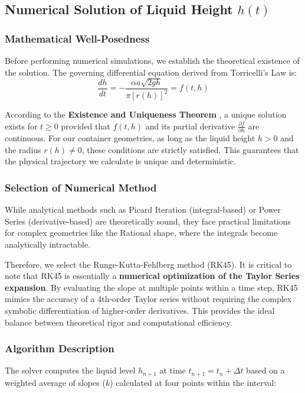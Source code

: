 \documentclass[a4paper, 12pt]{article}
\begin{document}
\subsection{Numerical Solution of Liquid Height $h(t)$}

\subsubsection{Mathematical Well-Posedness}
Before performing numerical simulations, we establish the theoretical existence of the solution. The governing differential equation derived from Torricelli's Law is:
\begin{equation}
    \frac{dh}{dt} = -\frac{\alpha a \sqrt{2gh}}{\pi \left[r(h)\right]^2} = f(t,h)
\end{equation}

According to the \textbf{Existence and Uniqueness Theorem} , a unique solution exists for $t \ge 0$ provided that $f(t, h)$ and its partial derivative $\frac{\partial f}{\partial h}$ are continuous. 
For our container geometries, as long as the liquid height $h > 0$ and the radius $r(h) \neq 0$, these conditions are strictly satisfied. This guarantees that the physical trajectory we calculate is unique and deterministic.

\subsubsection{Selection of Numerical Method}
While analytical methods such as Picard Iteration (integral-based) or Power Series (derivative-based) are theoretically sound, they face practical limitations for complex geometries like the Rational shape, where the integrals become analytically intractable.

Therefore, we select the Runge-Kutta-Fehlberg method (RK45). It is critical to note that RK45 is essentially a \textbf{numerical optimization of the Taylor Series expansion}. By evaluating the slope at multiple points within a time step, RK45 mimics the accuracy of a 4th-order Taylor series without requiring the complex symbolic differentiation of higher-order derivatives. This provides the ideal balance between theoretical rigor and computational efficiency.

\subsubsection{Algorithm Description}
The solver computes the liquid level $h_{n+1}$ at time $t_{n+1} = t_n + \Delta t$ based on a weighted average of slopes ($k$) calculated at four points within the interval:
\end{document}
